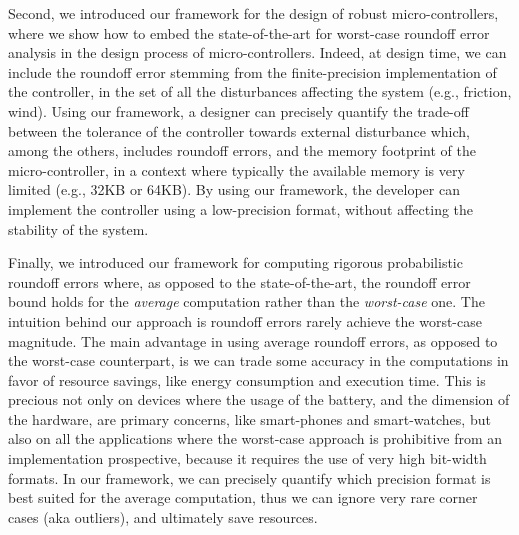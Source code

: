 Second, we introduced our framework for the design of robust micro-controllers, where we show how to embed the state-of-the-art for worst-case roundoff error analysis in the design process of micro-controllers.
%
Indeed, at design time, we can include the roundoff error stemming from the finite-precision implementation of the controller, in the set of all the disturbances affecting the system (e.g., friction, wind).
%
Using our framework, a designer can precisely quantify the trade-off between the tolerance of the controller towards external disturbance which, among the others, includes roundoff errors, and the memory footprint of the micro-controller, in a context where typically the available memory is very limited (e.g., 32KB or 64KB).
%
By using our framework, the developer can implement the controller using a low-precision format, without affecting the stability of the system.
%
%
%

Finally, we introduced our framework for computing rigorous probabilistic roundoff errors where, as opposed to the state-of-the-art, the roundoff error bound holds for the \emph{average} computation rather than the \emph{worst-case} one.
%
The intuition behind our approach is roundoff errors rarely achieve the worst-case magnitude. 
%
The main advantage in using average roundoff errors, as opposed to the worst-case counterpart, is we can trade some accuracy in the computations in favor of resource savings, like energy consumption and execution time.
%
This is precious not only on devices where the usage of the battery, and the dimension of the hardware, are primary concerns, like smart-phones and smart-watches, but also on all the applications where the worst-case approach is prohibitive from an implementation prospective, because it requires the use of very high bit-width formats. 
%
In our framework, we can precisely quantify which precision format is best suited for the average computation, thus we can ignore very rare corner cases (aka outliers), and ultimately save resources.
%